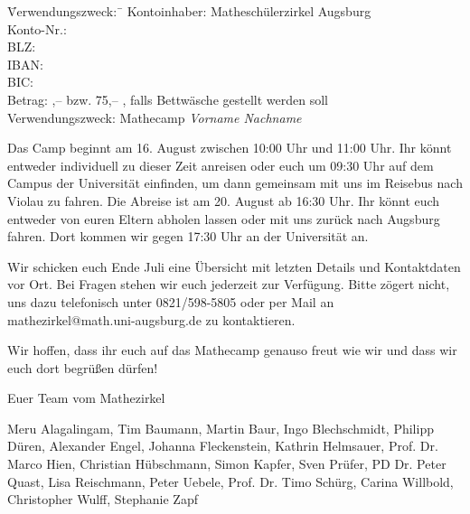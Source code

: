 \documentclass[12pt]{zettel}
\begin{document}
\vspace{-0.7em}
\begin{tabbing}
  \qquad\quad \= Verwendungszweck:\, \= \kill
  \> Kontoinhaber: \> Matheschülerzirkel Augsburg \\
  \> Konto-Nr.:  \\
  \> BLZ:  \\
  \> IBAN:  \\
  \> BIC:  \\
  \> Betrag: ,-- \texteuro{} bzw. 75,-- \texteuro, falls Bettwäsche
  gestellt werden soll \\
  \> Verwendungszweck: \> Mathecamp \emph{Vorname Nachname}
\end{tabbing}
\vspace{-0.7em}

Das Camp beginnt am 16. August zwischen 10:00 Uhr und 11:00 Uhr. Ihr könnt
entweder individuell zu dieser Zeit anreisen oder euch um 09:30 Uhr auf dem Campus der
Universität einfinden, um dann gemeinsam mit uns im Reisebus nach Violau zu fahren.
Die Abreise ist am 20. August ab 16:30 Uhr. Ihr könnt euch entweder von euren
Eltern abholen lassen oder mit uns zurück nach Augsburg fahren. Dort kommen wir
gegen 17:30 Uhr an der Universität an.

Wir schicken euch Ende Juli eine Übersicht mit
letzten Details und Kontaktdaten vor Ort. Bei Fragen stehen wir euch jederzeit
zur Verfügung. Bitte zögert nicht, uns dazu telefonisch unter 0821/598-5805 oder per
Mail an \textsf{mathezirkel@math.uni-augsburg.de} zu kontaktieren.

Wir hoffen, dass ihr euch auf das Mathecamp genauso freut wie wir und dass wir
euch dort begrüßen dürfen!

\vspace{2em}

Euer Team vom Mathezirkel

Meru Alagalingam, Tim Baumann, Martin Baur, Ingo Blechschmidt, Philipp Düren,
Alexander Engel, Johanna Fleckenstein, Kathrin Helmsauer, Prof. Dr. Marco Hien,
Christian Hübschmann, Simon Kapfer, Sven Prüfer, PD Dr. Peter Quast,
Lisa Reischmann, Peter Uebele, Prof. Dr. Timo Schürg, Carina Willbold,
Christopher Wulff, Stephanie Zapf
\end{document}
